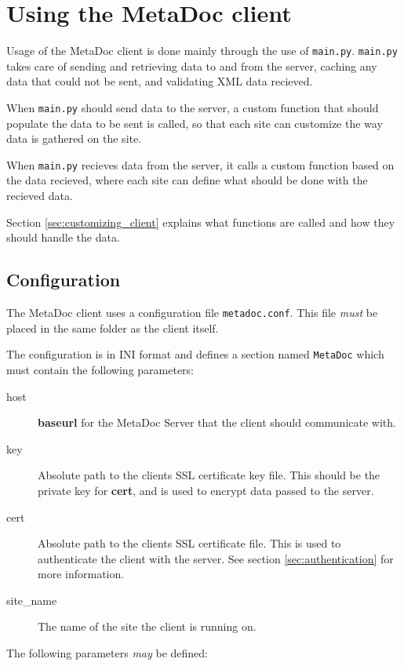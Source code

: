 \newpage
\section{Using the MetaDoc client}
\label{sec:usage}
Usage of the MetaDoc client is done mainly through the use of \texttt{main.py}.
\texttt{main.py} takes care of sending and retrieving data to and from the 
server, caching any data that could not be sent, and validating XML data 
recieved.

When \texttt{main.py} should send data to the server, a custom function that
should populate the data to be sent is called, so that each site can customize
the way data is gathered on the site. 

When \texttt{main.py} recieves data from the server, it calls a custom function
based on the data recieved, where each site can define what should be done with
the recieved data.

Section \ref{sec:customizing_client} explains what functions are called and how
they should handle the data. 

\subsection{Configuration}
\label{sec:metadoc_conf}
The MetaDoc client uses a configuration file \texttt{metadoc.conf}. This file
\textit{must} be placed in the same folder as the client itself. 

The configuration is in INI format and defines a section named \texttt{MetaDoc}
which must contain the following parameters:

\begin{description}
    \item[host] \textbf{baseurl} for the MetaDoc Server that the client should
        communicate with.
    \item[key]  Absolute path to the clients SSL certificate key file. This
        should be the private key for \textbf{cert}, and is used to encrypt
        data passed to the server.
    \item[cert] Absolute path to the clients SSL certificate file. This is used
        to authenticate the client with the server. See section
        \ref{sec:authentication} for more information.
    \item[site\_name]   The name of the site the client is running on. 
\end{description}

The following parameters \textit{may} be defined:


